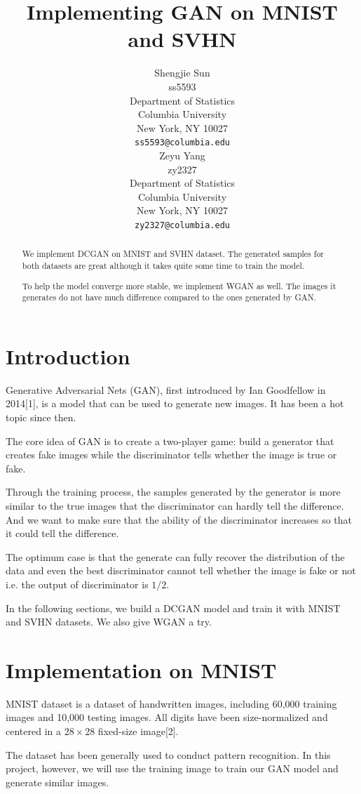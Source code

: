 \documentclass{article}
\title{Implementing GAN on MNIST and SVHN}
\author{%
  Shengjie Sun \\
  ss5593\\
  Department of Statistics\\
  Columbia University\\
  New York, NY 10027 \\
  \texttt{ss5593@columbia.edu} \\
  \And
  Zeyu Yang \\
  zy2327 \\
  Department of Statistics\\
  Columbia University\\
  New York, NY 10027 \\
  \texttt{zy2327@columbia.edu}
}
\begin{document}
\maketitle

\begin{abstract}
  We implement DCGAN on MNIST and SVHN dataset.
  The generated samples for both datasets are great although it takes quite some time to train the model.
  
  To help the model converge more stable, we implement WGAN as well. The images it generates do not have much difference compared to the ones generated by GAN.
\end{abstract}

\section{Introduction}

Generative Adversarial Nets (GAN), first introduced by Ian Goodfellow in 2014[1], is a model that can be used to generate new images. 
It has been a hot topic since then.

The core idea of GAN is to create a two-player game:
build a generator that creates fake images while the discriminator tells whether the image is true or fake.

Through the training process, the samples generated by the generator is more similar to the true images that the discriminator can hardly tell the difference. And we want to make sure that the ability of the discriminator increases so that it could tell the difference.

The optimum case is that the generate can fully recover the distribution of the data and even the best discriminator cannot tell whether the image is fake or not i.e. the output of discriminator is $1/2$. 

In the following sections, we build a DCGAN model and train it with MNIST and SVHN datasets. We also give WGAN a try.

\section{Implementation on MNIST}

MNIST dataset is a dataset of handwritten images, including 60,000 training images and 10,000 testing images.
All digits have been size-normalized and centered in a $28\times 28$ fixed-size image[2].

The dataset has been generally used to conduct pattern recognition. 
In this project, however, we will use the training image to train our GAN model and generate similar images.
\end{document}
